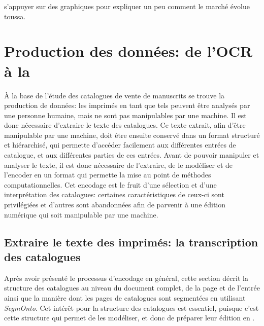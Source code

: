 s'appuyer sur des graphiques pour expliquer un peu comment le marché évolue toussa.

\chapter{Production des données: de l'OCR à la \tei{}}
À la base de l'étude des catalogues de vente de manuscrits se trouve la production de données: les imprimés en tant que tels peuvent être analysés par une personne humaine, mais ne sont pas manipulables par une machine. Il est donc nécessaire d'extraire le texte des catalogues. Ce texte extrait, afin d'être manipulable par une machine, doit être ensuite conservé dans un format structuré et hiérarchisé, qui permette d'accéder facilement aux différentes entrées de catalogue, et aux différentes parties de ces entrées. Avant de pouvoir manipuler et analyser le texte, il est donc nécessaire de l'extraire, de le modéliser et de l'encoder en un format qui permette la mise au point de méthodes computationnelles. Cet encodage est le fruit d'une sélection et d'une interprétation des catalogues: certaines caractéristiques de ceux-ci sont privilégiées et d'autres sont abandonnées afin de parvenir à une édition numérique qui soit manipulable par une machine.

\section{Extraire le texte des imprimés: la transcription des catalogues}
Après avoir présenté le processus d'encodage en général, cette section décrit la structure des catalogues au niveau du document complet, de la page et de l'entrée ainsi que la manière dont les pages de catalogues sont segmentées en utilisant \textit{SegmOnto}. Cet intérêt pour la structure des catalogues est essentiel, puisque c'est cette structure qui permet de les modéliser, et donc de préparer leur édition en \xmltei{}.

